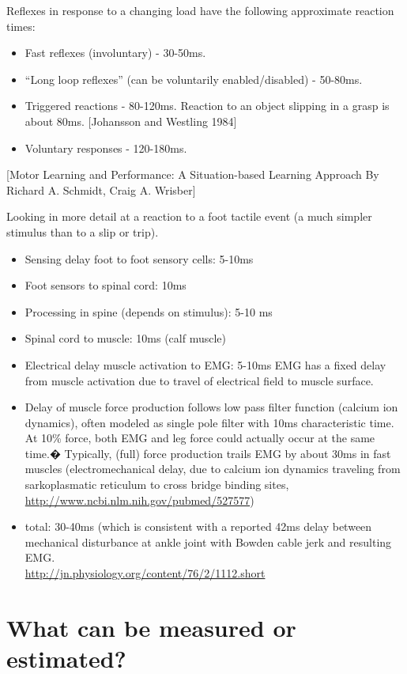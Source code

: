 \documentclass[letterpaper,12pt,fullpage]{article}
\begin{document}
Reflexes in response to a changing load have the following approximate reaction times:
\begin{itemize}
\item
Fast reflexes (involuntary) - 30-50ms.
\item
``Long loop reflexes'' (can be voluntarily enabled/disabled) - 50-80ms.
\item
Triggered reactions - 80-120ms.
Reaction to an object slipping in a grasp is about 80ms.
[Johansson and Westling 1984]
\item
Voluntary responses - 120-180ms.
\end{itemize}
[Motor Learning and Performance: A Situation-based Learning Approach
 By Richard A. Schmidt, Craig A. Wrisber]

Looking in more detail at a reaction to a foot tactile event (a much
simpler stimulus than to a slip or trip).
\begin{itemize}
\item
Sensing delay foot to foot sensory cells: 5-10ms
\item
Foot sensors to spinal cord: 10ms 
\item
Processing in spine (depends on stimulus): 5-10 ms
\item
Spinal cord to muscle: 10ms (calf muscle)
\item
Electrical delay muscle activation to EMG: 5-10ms
EMG has a fixed delay from muscle activation due to
travel of electrical field to muscle surface.
\item
Delay
of muscle force production follows low pass filter function (calcium
ion dynamics), often modeled as single pole filter with 10ms
characteristic time. At 10\% force, both EMG and leg force could
actually occur at the same time.�
Typically, (full) force production trails EMG by about 30ms in fast
muscles (electromechanical delay, due to calcium ion dynamics
traveling from sarkoplasmatic reticulum to cross bridge binding
sites,\\
\url{http://www.ncbi.nlm.nih.gov/pubmed/527577})
\item
total: 30-40ms (which is consistent with a reported 42ms delay
between mechanical disturbance at ankle joint with Bowden cable jerk
and resulting EMG.\\
\url{http://jn.physiology.org/content/76/2/1112.short}
\end{itemize}

\section{What can be measured or estimated?}
\end{document}
